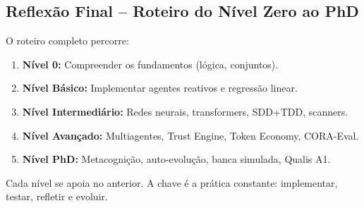 \subsection*{Reflexão Final -- Roteiro do Nível Zero ao PhD}
O roteiro completo percorre:
\begin{enumerate}
\item \textbf{Nível 0:} Compreender os fundamentos (lógica, conjuntos).
\item \textbf{Nível Básico:} Implementar agentes reativos e regressão linear.
\item \textbf{Nível Intermediário:} Redes neurais, transformers,
      SDD+TDD, scanners.
\item \textbf{Nível Avançado:} Multiagentes, Trust Engine, Token Economy,
      CORA-Eval.
\item \textbf{Nível PhD:} Metacognição, auto-evolução, banca simulada,
      Qualis A1.
\end{enumerate}

Cada nível se apoia no anterior. A chave é a prática constante:
implementar, testar, refletir e evoluir.
